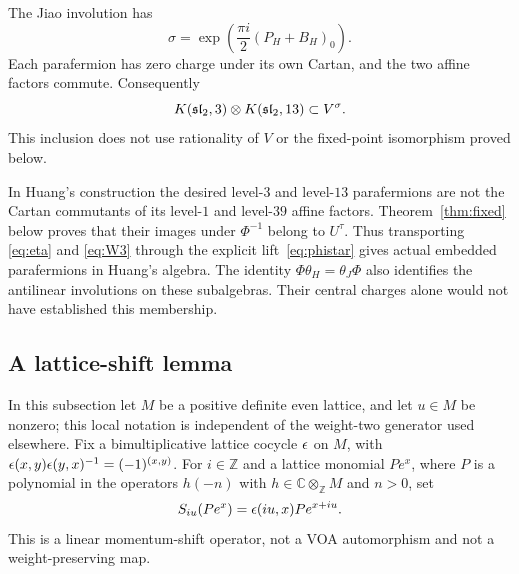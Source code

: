 \documentclass[11pt,reqno]{amsart}
\theoremstyle{definition}\newtheorem{definition}[theorem]{Definition}
\theoremstyle{remark}\newtheorem{remark}[theorem]{Remark}
\newcommand{\C}{\mathbb C}\newcommand{\Z}{\mathbb Z}\newcommand{\Q}{\mathbb Q}
\numberwithin{equation}{section}
\begin{document}
The Jiao involution has
\[
 \sigma=\exp\!\left(\frac{\pi i}{2}(P_H+B_H)_{0}\right).
\]
Each parafermion has zero charge under its own Cartan, and the two affine factors commute. Consequently
\begin{equation}\label{eq:parainfixed}
 K(\mathfrak{sl}_2,3)\otimes K(\mathfrak{sl}_2,13)\subset V^\sigma.
\end{equation}
This inclusion does not use rationality of $V$ or the fixed-point isomorphism proved below.

In Huang's construction the desired level-$3$ and level-$13$ parafermions are not the Cartan commutants of its level-$1$ and level-$39$ affine factors. Theorem~\ref{thm:fixed} below proves that their images under $\Phi^{-1}$ belong to $U^\tau$. Thus transporting \eqref{eq:eta} and \eqref{eq:W3} through the explicit lift~\eqref{eq:phistar} gives actual embedded parafermions in Huang's algebra. The identity $\Phi\theta_H=\theta_J\Phi$ also identifies the antilinear involutions on these subalgebras. Their central charges alone would not have established this membership.

\subsection{A lattice-shift lemma}
In this subsection let $M$ be a positive definite even lattice, and let $u\in M$ be nonzero; this local notation is independent of the weight-two generator used elsewhere. Fix a bimultiplicative lattice cocycle $\epsilon$ on $M$, with $\epsilon(x,y)\epsilon(y,x)^{-1}=(-1)^{(x,y)}$. For $i\in\Z$ and a lattice monomial $Pe^x$, where $P$ is a polynomial in the operators $h(-n)$ with $h\in\C\otimes_\Z M$ and $n>0$, set
\[
 S_{iu}(Pe^x)=\epsilon(iu,x)Pe^{x+iu}.
\]
This is a linear momentum-shift operator, not a VOA automorphism and not a weight-preserving map.
\end{document}
